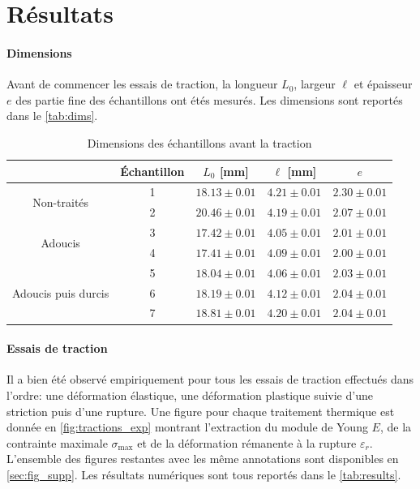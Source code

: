 \section{Résultats}

\paragraph{Dimensions} Avant de commencer les essais de traction, la longueur \(L_0\), largeur \(\ell\) et épaisseur \(e\) des partie fine des échantillons ont étés mesurés. Les dimensions sont reportés dans le \autoref{tab:dims}.

\begin{table}[h]
    \centering
    \begin{tabular}{ |c||c|c|c|c| }
        \cline{2-5}
        \multicolumn{1}{c|}{} & Échantillon & \(L_0\) [mm] & \(\ell\) [mm] & \(e\) \\
        \hline
        \multirow{2}{3cm}{Non-traités} & 1 & \(18.13 \pm 0.01\) & \(4.21 \pm 0.01\) & \(2.30 \pm 0.01\) \\
        & 2 & \(20.46 \pm 0.01\) & \(4.19 \pm 0.01\) & \(2.07 \pm 0.01\) \\
        \hline
        \multirow{2}{3cm}{Adoucis} & 3 & \(17.42 \pm 0.01\) & \(4.05 \pm 0.01\) & \(2.01 \pm 0.01\) \\
        & 4 & \(17.41 \pm 0.01\) & \(4.09 \pm 0.01\) & \(2.00 \pm 0.01\) \\
        \hline
        \multirow{3}{3cm}{Adoucis puis durcis} & 5 & \(18.04 \pm 0.01\) & \(4.06 \pm 0.01\) & \(2.03 \pm 0.01\) \\
        & 6 & \(18.19 \pm 0.01\) & \(4.12 \pm 0.01\) & \(2.04 \pm 0.01\) \\
        & 7 & \(18.81 \pm 0.01\) & \(4.20 \pm 0.01\) & \(2.04 \pm 0.01\) \\
        \hline
    \end{tabular}
    \caption{Dimensions des échantillons avant la traction}
    \label{tab:dims}
\end{table}

\paragraph{Essais de traction}
Il a bien été observé empiriquement pour tous les essais de traction effectués dans l'ordre: une déformation élastique, une déformation plastique suivie d'une striction puis d'une rupture. Une figure pour chaque traitement thermique est donnée en \autoref{fig:tractions_exp} montrant l'extraction du module de Young $E$, de la contrainte maximale $\sigma_\mathrm{max}$ et de la déformation rémanente à la rupture $\varepsilon_r$. L'ensemble des figures restantes avec les même annotations sont disponibles en \autoref{sec:fig_supp}. Les résultats numériques sont tous reportés dans le \autoref{tab:results}.

